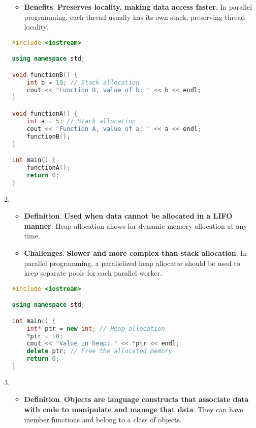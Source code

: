\begin{enumerate}
\begin{itemize}
        \item[\textcolor{Green3}{\faIcon{check}}] \textcolor{Green3}{\textbf{Benefits}}. \textbf{Preserves locality, making data access faster}. In parallel programming, each thread usually has its own stack, preserving thread locality.
    \end{itemize}
    \begin{examplebox}
        \begin{lstlisting}[language=c++]
#include <iostream>

using namespace std;

void functionB() {
    int b = 10; // Stack allocation
    cout << "Function B, value of b: " << b << endl;
}

void functionA() {
    int a = 5; // Stack allocation
    cout << "Function A, value of a: " << a << endl;
    functionB();
}

int main() {
    functionA();
    return 0;
}\end{lstlisting}
    \end{examplebox}


    \item {}
    \begin{itemize}
        \item[\textcolor{Red2}{\faIcon{book}}] \textcolor{Red2}{\textbf{Definition}}. \textbf{Used when data cannot be allocated in a LIFO manner}. Heap allocation allows for dynamic memory allocation at any time.

        \item[\textcolor{Green3}{\faIcon{question}}] \textcolor{Green3}{\textbf{Challenges}}. \textbf{Slower and more complex than stack allocation}. In parallel programming, a parallelized heap allocator should be used to keep separate pools for each parallel worker.
    \end{itemize}
    \begin{examplebox}
        \begin{lstlisting}[language=c++]
#include <iostream>

using namespace std;

int main() {
    int* ptr = new int; // Heap allocation
    *ptr = 10;
    cout << "Value in heap: " << *ptr << endl;
    delete ptr; // Free the allocated memory
    return 0;
}\end{lstlisting}
    \end{examplebox}


    \newpage
    \item {}
    \begin{itemize}
        \item[\textcolor{Red2}{\faIcon{book}}] \textcolor{Red2}{\textbf{Definition}}. \textbf{Objects are language constructs that associate data with code to manipulate and manage that data}. They can have member functions and belong to a class of objects.


\end{itemize}
\end{enumerate}
